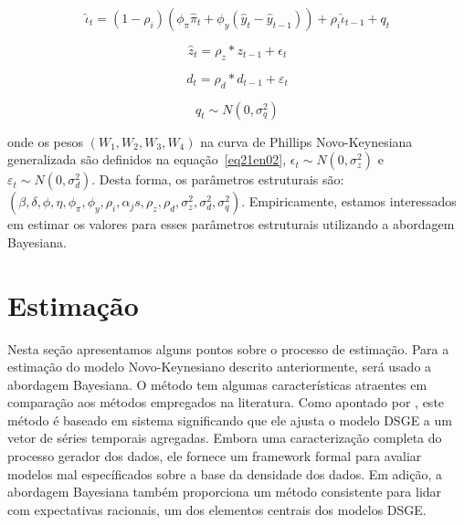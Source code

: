 \documentclass[twoside,a4paper,11pt]{report}
\begin{document}
{{\begin{equation}\label{eq26en02}
{\hat{\iota}}_{t}=(1-{\rho}_{i})({\phi}_{\pi}{\hat{\pi}}_{t}+{\phi}_{y}({\hat{y}}_{t}-{\hat{y}}_{t-1}))+{\rho}_{i}{\hat{\iota}}_{t-1}+{q}_{t}
\end{equation}

\begin{equation}\label{eq27en02}
{\hat{z}}_{t}={\rho}_{z}\ast {z}_{t-1}+{\epsilon}_{t}
\end{equation}

\begin{equation}\label{eq28en02}
{d}_{t}={\rho}_{d}\ast {d}_{t-1}+{\varepsilon}_{t}
\end{equation}

\begin{equation}\label{eq29en02}
{q}_{t}\sim N\left(0,{\sigma}_{q}^{2}\right) 
\end{equation}

\noindent onde os pesos $(W_{1},W_{2},W_{3},W_{4})$ na curva de Phillips Novo-Keynesiana generalizada são definidos na equação~\ref{eq21en02}, ${\epsilon}_{t}\sim N\left( 0,{\sigma}_{z}^{2}\right)$ e ${\varepsilon}_{t}\sim N\left( 0,{\sigma}_{d}^{2}\right)$. Desta forma, os parâmetros estruturais são: $(\beta,\delta,\phi,\eta,\phi_{\pi},\phi_{y},\rho_{i},\alpha_{j}s,\rho_{z},\rho_{d},{\sigma}_{z}^{2},{\sigma}_{d}^{2},{\sigma}_{q}^{2})$. Empiricamente, estamos interessados em estimar os valores para esses parâmetros estruturais utilizando a abordagem Bayesiana.

\section*{Estimação}

Nesta seção apresentamos alguns pontos sobre o processo de estimação. Para a estimação do modelo Novo-Keynesiano descrito anteriormente, será usado a abordagem Bayesiana. O método tem algumas características atraentes em comparação aos métodos empregados na literatura. Como apontado por \citet{an2007bayesian}, este método é baseado em sistema significando que ele ajusta o modelo DSGE a um vetor de séries temporais agregadas. Embora uma caracterização completa do processo gerador dos dados, ele fornece um framework formal para avaliar modelos mal específicados sobre a base da densidade dos dados. Em adição, a abordagem Bayesiana também proporciona um método consistente para lidar com expectativas racionais, um dos elementos centrais dos modelos DSGE.

}}
\end{document}
